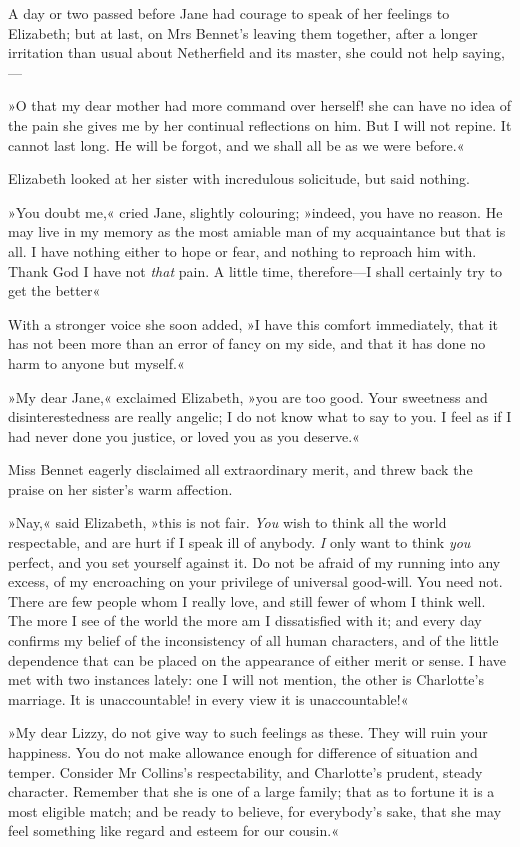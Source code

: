 A day or two passed before Jane had courage to speak of her feelings to Elizabeth; but at last, on Mrs Bennet's leaving them together, after a longer irritation than usual about Netherfield and its master, she could not help saying,—

»O that my dear mother had more command over herself! she can have no idea of the pain she gives me by her continual reflections on him. But I will not repine. It cannot last long. He will be forgot, and we shall all be as we were before.«

Elizabeth looked at her sister with incredulous solicitude, but said nothing.

»You doubt me,« cried Jane, slightly colouring; »indeed, you have no reason. He may live in my memory as the most amiable man of my acquaintance but that is all. I have nothing either to hope or fear, and nothing to reproach him with. Thank God I have not \textit{that} pain. A little time, therefore—I shall certainly try to get the better\longdash«

With a stronger voice she soon added, »I have this comfort immediately, that it has not been more than an error of fancy on my side, and that it has done no harm to anyone but myself.«

»My dear Jane,« exclaimed Elizabeth, »you are too good. Your sweetness and disinterestedness are really angelic; I do not know what to say to you. I feel as if I had never done you justice, or loved you as you deserve.«

Miss Bennet eagerly disclaimed all extraordinary merit, and threw back the praise on her sister's warm affection.

»Nay,« said Elizabeth, »this is not fair. \textit{You} wish to think all the world respectable, and are hurt if I speak ill of anybody. \textit{I} only want to think \textit{you} perfect, and you set yourself against it. Do not be afraid of my running into any excess, of my encroaching on your privilege of universal good-will. You need not. There are few people whom I really love, and still fewer of whom I think well. The more I see of the world the more am I dissatisfied with it; and every day confirms my belief of the inconsistency of all human characters, and of the little dependence that can be placed on the appearance of either merit or sense. I have met with two instances lately: one I will not mention, the other is Charlotte's marriage. It is unaccountable! in every view it is unaccountable!«

»My dear Lizzy, do not give way to such feelings as these. They will ruin your happiness. You do not make allowance enough for difference of situation and temper. Consider Mr Collins's respectability, and Charlotte's prudent, steady character. Remember that she is one of a large family; that as to fortune it is a most eligible match; and be ready to believe, for everybody's sake, that she may feel something like regard and esteem for our cousin.«

